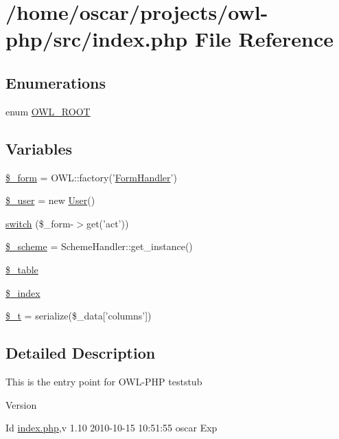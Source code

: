 \section{/home/oscar/projects/owl-\/php/src/index.php File Reference}
\label{index_8php}
\subsection*{Enumerations}
\begin{DoxyCompactItemize}
\item 
enum \hyperlink{index_8php_a35612f9a6bd7277982731a74593272c4}{OWL\_\-ROOT} 
\end{DoxyCompactItemize}
\subsection*{Variables}
\begin{DoxyCompactItemize}
\item 
\hyperlink{index_8php_ab14b242803551e0f269742a7103f149d}{\$\_\-form} = OWL::factory('\hyperlink{classFormHandler}{FormHandler}')
\item 
\hyperlink{index_8php_a5df5982b9dadc74df05081972cd67fdf}{\$\_\-user} = new \hyperlink{classUser}{User}()
\item 
\hyperlink{index_8php_aa284f7d5270c1aa684d885f7bb70d532}{switch} (\$\_\-form-\/$>$get('act'))
\item 
\hyperlink{index_8php_abb5321c25f21f089f5c253d5f2697502}{\$\_\-scheme} = SchemeHandler::get\_\-instance()
\item 
\hyperlink{index_8php_ac0ee5b766d19cb282552a3449a1f8376}{\$\_\-table}
\item 
\hyperlink{index_8php_a8fba9293fc0e3b428610c8208c00297d}{\$\_\-index}
\item 
\hyperlink{index_8php_a7a22c26026cc0626b015085e752b45cb}{\$\_\-t} = serialize(\$\_\-data\mbox{[}'columns'\mbox{]})
\end{DoxyCompactItemize}


\subsection{Detailed Description}
This is the entry point for OWL-\/PHP teststub \begin{DoxyVersion}{Version}

\end{DoxyVersion}
\begin{DoxyParagraph}{Id}
\hyperlink{index_8php}{index.php},v 1.10 2010-\/10-\/15 10:51:55 oscar Exp 
\end{DoxyParagraph}


